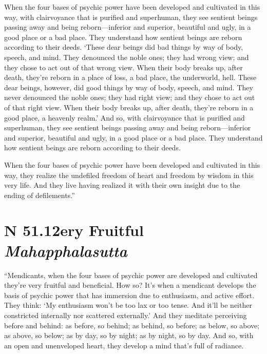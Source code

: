 \documentclass[12pt,openany]{book}%
\newcommand*{\suttatitleacronym}[1]{\smaller[2]{#1}\vspace*{.3em}}
\newcommand*{\suttatitletranslation}[1]{\linebreak{#1}}
\newcommand*{\suttatitleroot}[1]{\linebreak\smaller[2]\itshape{#1}}
\newcommand*{\tocacronym}[1]{\hspace*{-3.3em}{#1}\quad}
\newcommand*{\toctranslation}[1]{#1}
\newcommand*{\tocroot}[1]{(\textit{#1})}
\begin{document}
When the four bases of psychic power have been developed and cultivated in this way, with clairvoyance that is purified and superhuman, they see sentient beings passing away and being reborn—inferior and superior, beautiful and ugly, in a good place or a bad place. They understand how sentient beings are reborn according to their deeds. ‘These dear beings did bad things by way of body, speech, and mind. They denounced the noble ones; they had wrong view; and they chose to act out of that wrong view. When their body breaks up, after death, they’re reborn in a place of loss, a bad place, the underworld, hell. These dear beings, however, did good things by way of body, speech, and mind. They never denounced the noble ones; they had right view; and they chose to act out of that right view. When their body breaks up, after death, they’re reborn in a good place, a heavenly realm.’ And so, with clairvoyance that is purified and superhuman, they see sentient beings passing away and being reborn—inferior and superior, beautiful and ugly, in a good place or a bad place. They understand how sentient beings are reborn according to their deeds. 

When the four bases of psychic power have been developed and cultivated in this way, they realize the undefiled freedom of heart and freedom by wisdom in this very life. And they live having realized it with their own insight due to the ending of defilements.” 

%
\section*{{\suttatitleacronym SN 51.12}{\suttatitletranslation Very Fruitful }{\suttatitleroot Mahapphalasutta}}
\addcontentsline{toc}{section}{\tocacronym{SN 51.12} \toctranslation{Very Fruitful } \tocroot{Mahapphalasutta}}

“Mendicants, when the four bases of psychic power are developed and cultivated they’re very fruitful and beneficial. How so? It’s when a mendicant develops the basis of psychic power that has immersion due to enthusiasm, and active effort. They think: ‘My enthusiasm won’t be too lax or too tense. And it’ll be neither constricted internally nor scattered externally.’ And they meditate perceiving before and behind: as before, so behind; as behind, so before; as below, so above; as above, so below; as by day, so by night; as by night, so by day. And so, with an open and unenveloped heart, they develop a mind that’s full of radiance. 
\end{document}
